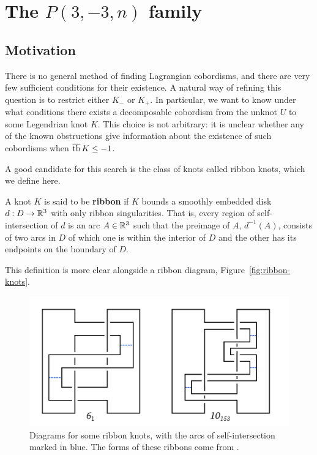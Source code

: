 \chapter{The \texorpdfstring{$P(3, -3, n)$}{P(3, -3, n)} family}\label{ch:pretzel}
\section{Motivation}\label{sec:motivation}
There is no general method of finding Lagrangian cobordisms, and there are very few sufficient conditions for their existence.
A natural way of refining this question is to restrict either $K_-$ or $K_+$.
In particular, we want to know under what conditions there exists a decomposable cobordism from the unknot $U$ to some Legendrian knot $K$. This choice is not arbitrary: it is unclear whether any of the known obstructions give information about the existence of such cobordisms when $\overline{\operatorname{tb}}\, K \leq -1$.

A good candidate for this search is the class of knots called ribbon knots, which we define here.

\begin{definition}
    A knot $K$ is said to be \textbf{ribbon} if $K$ bounds a smoothly embedded disk $d: D \to \mathbb{R}^3$ with only ribbon singularities.
    That is, every region of self-intersection of $d$ is an arc $A \in \mathbb{R}^3$ such that the preimage of $A$, $d^{-1} (A)$, consists of two arcs in $D$ of which one is within the interior of $D$ and the other has its endpoints on the boundary of $D$.
\end{definition}

This definition is more clear alongside a ribbon diagram, Figure~\ref{fig:ribbon-knots}.

\begin{figure}[ht!]
    \centering
    \includegraphics[width=0.8\linewidth]{images/ribbons.pdf}
    \caption{Diagrams for some ribbon knots, with the arcs of self-intersection marked in blue. The forms of these ribbons come from \cite{kawauchi}.}
    \label{fig:ribbons}
\end{figure}

